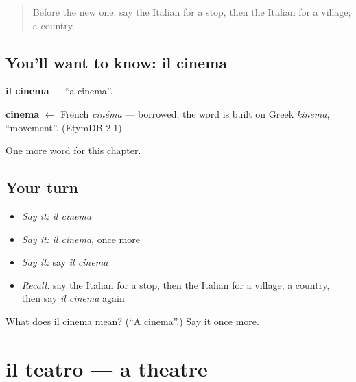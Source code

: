 \label{lesson:IT-C87-cinema}



\begin{quote}
Before the new one: say the Italian for a stop, then the Italian for a village; a country.
\end{quote}

\subsection*{You'll want to know: il cinema}
\textbf{il cinema} — \textquotedblleft{}a cinema\textquotedblright{}.

\begin{cousinweb}
\textbf{cinema} $\leftarrow$ French \emph{cinéma} — borrowed; the word is built on Greek \emph{kinema}, \textquotedblleft{}movement\textquotedblright{}. (EtymDB 2.1)
\end{cousinweb}

\begin{grammarlens}[title={What you've built}]
One more word for this chapter.
\end{grammarlens}

\subsection*{Your turn}
\begin{itemize}
\raggedright
  \item \emph{Say it:} \emph{il cinema}
  \item \emph{Say it:} \emph{il cinema}, once more
  \item \emph{Say it:} say \emph{il cinema}
  \item \emph{Recall:} say the Italian for a stop, then the Italian for a village; a country, then say \emph{il cinema} again
\end{itemize}

\begin{tcolorbox}[breakable,colback=teal!4,colframe=teal!35!black,title={Before you move on}]
What does il cinema mean? (\textquotedblleft{}A cinema\textquotedblright{}.) Say it once more.
\end{tcolorbox}
\section[il teatro]{il teatro — a theatre}

\label{lesson:IT-C87-teatro}




